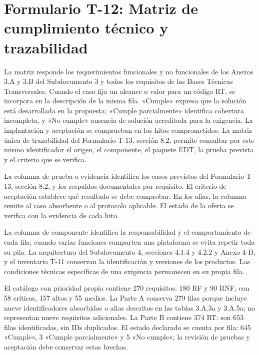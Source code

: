 \documentclass[oficio,firma,final]{lafrox}
\begin{document}
\portadalafrox
\indicelafrox
\listatablaslafrox

\chapter*{Formulario T-12: Matriz de cumplimiento técnico y trazabilidad}

La matriz responde los requerimientos funcionales y no funcionales de los Anexos 3.A y 3.B del Subdocumento 3 y todos los requisitos de las Bases Técnicas Transversales. Cuando el caso fija un alcance o valor para un código RT, se incorpora en la descripción de la misma fila. «Cumple» expresa que la solución está desarrollada en la propuesta; «Cumple parcialmente» identifica cobertura incompleta, y «No cumple» ausencia de solución acreditada para la exigencia. La implantación y aceptación se comprueban en los hitos comprometidos. La matriz única de trazabilidad del Formulario T-13, sección 8.2, permite consultar por este mismo identificador el origen, el componente, el paquete EDT, la prueba prevista y el criterio que se verifica.

La columna de prueba o evidencia identifica los casos previstos del Formulario T-13, sección 8.2, y los respaldos documentales por requisito. El criterio de aceptación establece qué resultado se debe comprobar. En los alias, la columna remite al caso absorbente o al protocolo aplicable. El estado de la oferta se verifica con la evidencia de cada hito.

La columna de componente identifica la responsabilidad y el comportamiento de cada fila; cuando varias funciones comparten una plataforma se evita repetir toda su pila. La arquitectura del Subdocumento 4, secciones 4.1.4 y 4.2.2 y Anexo 4-D, y el inventario T-11 conservan la identificación y versiones de los productos. Las condiciones técnicas específicas de una exigencia permanecen en su propia fila.

El catálogo con prioridad propia contiene 270 requisitos: 180 RF y 90 RNF, con 58 críticos, 157 altos y 55 medios. La Parte A conserva 279 filas porque incluye nueve identificadores absorbidos o alias descritos en las tablas 3.A.3a y 3.A.5a; no representan nueve requisitos adicionales. La Parte B contiene 374 RT: son 653 filas identificadas, sin IDs duplicados. El estado declarado se cuenta por fila: 645 «Cumple», 3 «Cumple parcialmente» y 5 «No cumple»; la revisión de pruebas y aceptación debe conservar estas brechas.
\end{document}
